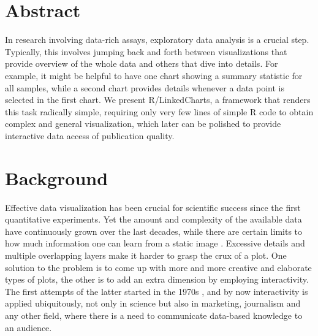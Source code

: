 \documentclass[twocolumn,10pt]{article}
\begin{document}
\setcounter{secnumdepth}{0}



\section{Abstract}
In research involving data-rich assays, exploratory data analysis is a crucial step. Typically, this involves jumping back and forth between visualizations that provide overview of the whole data and others that dive into details. For example, it might be helpful to have one chart showing a summary statistic for all samples, while a second chart provides details whenever a data point is selected in the first chart. We present R/LinkedCharts, a framework that renders this task radically simple, requiring only very few lines of simple R code to obtain complex and general visualization, which later can be polished to provide interactive data access of publication quality.

\section{Background}

Effective data visualization has been crucial for scientific success since the first quantitative experiments. Yet the amount and complexity of the available data have continuously grown over the last decades, while there are certain limits to how much information one can learn from a static image \citep{hegarty_2011}. Excessive details and multiple overlapping layers make it harder to grasp the crux of a plot. One solution to the problem is to come up with more and more creative and elaborate types of plots, the other is to add an extra dimension by employing interactivity. The first attempts of the latter started in the 1970s \citep{newman_1979, becker_1987}, and by now interactivity is applied ubiquitously, not only in science but also in marketing, journalism and any other field, where there is a need to communicate data-based knowledge to an audience.
\end{document}
